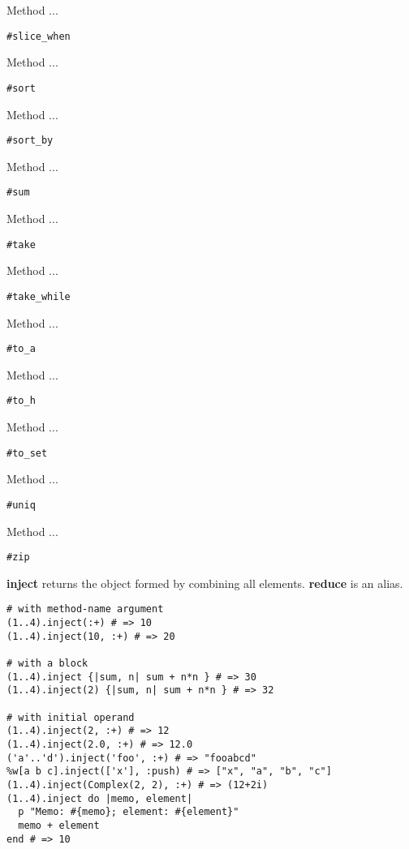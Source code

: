 Method ...
\begin{verbatim}
#slice_when
\end{verbatim}

Method ...
\begin{verbatim}
#sort
\end{verbatim}

Method ...
\begin{verbatim}
#sort_by
\end{verbatim}

Method ...
\begin{verbatim}
#sum
\end{verbatim}

Method ...
\begin{verbatim}
#take
\end{verbatim}

Method ...
\begin{verbatim}
#take_while
\end{verbatim}

Method ...
\begin{verbatim}
#to_a
\end{verbatim}

Method ...
\begin{verbatim}
#to_h
\end{verbatim}

Method ...
\begin{verbatim}
#to_set
\end{verbatim}

Method ...
\begin{verbatim}
#uniq
\end{verbatim}

Method ...
\begin{verbatim}
#zip
\end{verbatim}

\textbf{inject} returns the object formed by combining all elements.
\textbf{reduce} is an alias.
\begin{verbatim}
# with method-name argument
(1..4).inject(:+) # => 10
(1..4).inject(10, :+) # => 20

# with a block
(1..4).inject {|sum, n| sum + n*n } # => 30
(1..4).inject(2) {|sum, n| sum + n*n } # => 32

# with initial operand
(1..4).inject(2, :+) # => 12
(1..4).inject(2.0, :+) # => 12.0
('a'..'d').inject('foo', :+) # => "fooabcd"
%w[a b c].inject(['x'], :push) # => ["x", "a", "b", "c"]
(1..4).inject(Complex(2, 2), :+) # => (12+2i)
(1..4).inject do |memo, element|
  p "Memo: #{memo}; element: #{element}"
  memo + element
end # => 10
\end{verbatim}